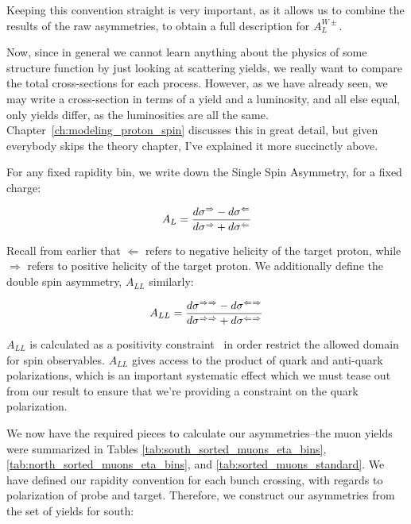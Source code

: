 Keeping this convention straight is very important, as it allows us to combine
the results of the raw asymmetries, to obtain a full description for
$A_L^{W\pm}$. 

Now, since in general we cannot learn anything about the physics of some
structure function by just looking at scattering yields, we really want to
compare the total cross-sections for each process. However, as we have already
seen, we may write a cross-section in terms of a yield and a luminosity, and all
else equal, only yields differ, as the luminosities are all the same.
Chapter~\ref{ch:modeling_proton_spin} discusses this in great detail, but given
everybody skips the theory chapter, I've explained it more succinctly above.

For any fixed rapidity bin, we write down the Single Spin Asymmetry, for a fixed
charge:

\begin{equation}
  A_L = {
    {d\sigma^{\Rightarrow}-d\sigma^{\Leftarrow}}
    \over
    {d\sigma^{\Rightarrow}+d\sigma^{\Leftarrow}}
  }
\end{equation}

Recall from earlier that $\Leftarrow$ refers to negative helicity of the target
proton, while $\Rightarrow$ refers to positive helicity of the target proton. We
additionally define the double spin asymmetry, $A_{LL}$ similarly:

\begin{equation}
  A_{LL} = {
    {d\sigma^{\Rightarrow\Rightarrow}-d\sigma^{\Leftarrow\Rightarrow}}
    \over
    {d\sigma^{\Rightarrow\Rightarrow}+d\sigma^{\Leftarrow\Rightarrow}}
  }
\end{equation}

$A_{LL}$ is calculated as a positivity constraint~\cite{Kang2011} in order
restrict the allowed domain for spin observables. $A_{LL}$ gives access to the
product of quark and anti-quark polarizations, which is an important systematic
effect which we must tease out from our result to ensure that we're providing a
constraint on the quark polarization.

We now have the required pieces to calculate our asymmetries--the muon yields
were summarized in Tables \ref{tab:south_sorted_muons_eta_bins},
\ref{tab:north_sorted_muons_eta_bins}, and \ref{tab:sorted_muons_standard}. We
have defined our rapidity convention for each bunch crossing, with regards to
polarization of probe and target. Therefore, we construct our asymmetries from
the set of yields for south:

